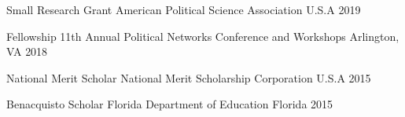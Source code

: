 

\begin{cvhonors}

  \cvhonor
    {Small Research Grant} %
    {American Political Science Association} %
    {U.S.A} %
    {2019} %

  \cvhonor
    {Fellowship} %
    {11th Annual Political Networks Conference and Workshops} %
    {Arlington, VA} %
    {2018} %

  \cvhonor
    {National Merit Scholar} %
    {National Merit Scholarship Corporation} %
    {U.S.A} %
    {2015} %

  \cvhonor
    {Benacquisto Scholar} %
    {Florida Department of Education} %
    {Florida} %
    {2015} %

\end{cvhonors}
